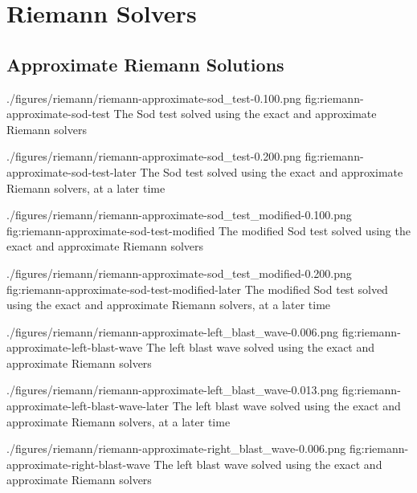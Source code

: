 \section{Riemann Solvers}



\subsection{Approximate Riemann Solutions}






\quickfigcap
	{./figures/riemann/riemann-approximate-sod_test-0.100.png}
	{fig:riemann-approximate-sod-test}
	{
		The Sod test solved using the exact and approximate Riemann solvers
	}
	

\quickfigcap
	{./figures/riemann/riemann-approximate-sod_test-0.200.png}
	{fig:riemann-approximate-sod-test-later}
	{
		The Sod test solved using the exact and approximate Riemann solvers, at a later time
	}
	




\quickfigcap
	{./figures/riemann/riemann-approximate-sod_test_modified-0.100.png}
	{fig:riemann-approximate-sod-test-modified}
	{
		The modified Sod test solved using the exact and approximate Riemann solvers
	}
	

\quickfigcap
	{./figures/riemann/riemann-approximate-sod_test_modified-0.200.png}
	{fig:riemann-approximate-sod-test-modified-later}
	{
		The modified Sod test solved using the exact and approximate Riemann solvers, at a later time
	}
	



\quickfigcap
	{./figures/riemann/riemann-approximate-left_blast_wave-0.006.png}
	{fig:riemann-approximate-left-blast-wave}
	{
		The left blast wave solved using the exact and approximate Riemann solvers
	}
	

\quickfigcap
	{./figures/riemann/riemann-approximate-left_blast_wave-0.013.png}
	{fig:riemann-approximate-left-blast-wave-later}
	{
		The left blast wave solved using the exact and approximate Riemann solvers, at a later time
	}
	





\quickfigcap
	{./figures/riemann/riemann-approximate-right_blast_wave-0.006.png}
	{fig:riemann-approximate-right-blast-wave}
	{
		The left blast wave solved using the exact and approximate Riemann solvers
	}
	

